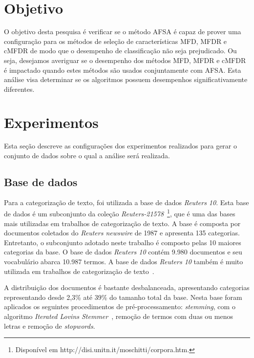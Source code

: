 \documentclass[conference]{IEEEtran}
\begin{document}
\section{Objetivo}
\label{sec:objetivo}

O objetivo desta pesquisa é verificar se o método AFSA é capaz de prover uma configuração para os métodos de seleção de características MFD, MFDR e cMFDR de modo que o desempenho de classificação não seja prejudicado. Ou seja, desejamos averiguar se o desempenho dos métodos MFD, MFDR e cMFDR é impactado quando estes métodos são usados conjuntamente com AFSA.
Esta análise visa determinar se os algoritmos possuem desempenhos significativamente diferentes.


\section{Experimentos}
\label{sec:exp}

Esta seção descreve as configurações dos experimentos realizados para gerar o conjunto de dados sobre o qual a análise será realizada.

\subsection{Base de dados}
\label{sec:bd}

Para a categorização de texto, foi utilizada a base de dados \textit{Reuters 10}.
Esta base de dados é um subconjunto da coleção \textit{Reuters-21578}~\footnote{Disponível em http://disi.unitn.it/moschitti/corpora.htm.}, que é uma das bases mais utilizadas em trabalhos de categorização de texto.
A base é composta por documentos coletados do \textit{Reuters newswire} de 1987 e apresenta 135 categorias.
Entretanto, o subconjunto adotado neste trabalho é composto pelas 10 maiores categorias da base.
O base de dados \textit{Reuters 10} contém 9.980 documentos e seu vocabulário abarca 10.987 termos.
A base de dados \textit{Reuters 10} também é muito utilizada em trabalhos de categorização de texto~\cite{chang2008multilabel,chen2009feature,yang2011new}. 

A distribuição dos documentos é bastante desbalanceada, apresentando categorias representando desde 2,3\% até 39\% do tamanho total da base. 
Nesta base foram aplicados os seguintes procedimentos de pré-processamento: \textit{stemming}, com o algoritmo \textit{Iterated Lovins Stemmer}~\cite{lovins1968development}, 
remoção de termos com duas ou menos letras e remoção de \textit{stopwords}.
\end{document}
